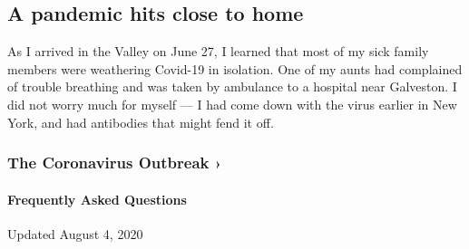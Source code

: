 \hypertarget{a-pandemic-hits-close-to-home}{%
\subsection{A pandemic hits close to
home}\label{a-pandemic-hits-close-to-home}}

As I arrived in the Valley on June 27, I learned that most of my sick
family members were weathering Covid-19 in isolation. One of my aunts
had complained of trouble breathing and was taken by ambulance to a
hospital near Galveston. I did not worry much for myself --- I had come
down with the virus earlier in New York, and had antibodies that might
fend it off.

\href{https://www.nytimes.com/news-event/coronavirus?action=click\&pgtype=Article\&state=default\&region=MAIN_CONTENT_3\&context=storylines_faq}{}

\hypertarget{the-coronavirus-outbreak-}{%
\subsubsection{The Coronavirus Outbreak
›}\label{the-coronavirus-outbreak-}}

\hypertarget{frequently-asked-questions}{%
\paragraph{Frequently Asked
Questions}\label{frequently-asked-questions}}

Updated August 4, 2020

